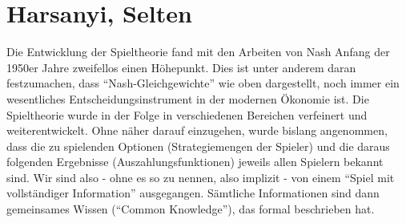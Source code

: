\section{Harsanyi, Selten}

Die Entwicklung der Spieltheorie fand mit den Arbeiten von Nash Anfang der 1950er Jahre zweifellos einen Höhepunkt. Dies ist unter anderem daran festzumachen, dass "`Nash-Gleichgewichte"' wie oben dargestellt, noch immer ein wesentliches Entscheidungsinstrument in der modernen Ökonomie ist. Die Spieltheorie wurde in der Folge in verschiedenen Bereichen verfeinert und weiterentwickelt. Ohne näher darauf einzugehen, wurde bislang angenommen, dass die zu spielenden Optionen (Strategiemengen der Spieler) und die daraus folgenden Ergebnisse (Auszahlungsfunktionen) jeweils allen Spielern bekannt sind. Wir sind also - ohne es so zu nennen, also implizit - von einem "`Spiel mit vollständiger Information"' ausgegangen. Sämtliche Informationen sind dann gemeinsames Wissen ("`Common Knowledge"'), das \textcite{Aumann1976} formal beschrieben hat.

